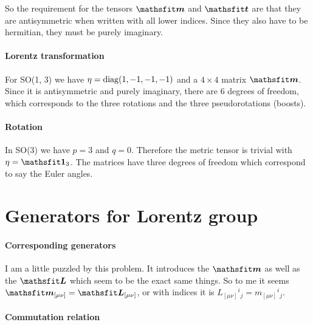 \documentclass[11pt, english, fleqn, DIV=15, headinclude, BCOR=1cm]{scrartcl}
\begin{document}
So the requirement for the tensors $\tens m$ and $\tens t$ are that they are
antisymmetric when written with all lower indices. Since they also have to be
hermitian, they must be purely imaginary.

\paragraph{Lorentz transformation}

For SO(1, 3) we have $\eta = \operatorname{diag}(1, -1, -1, -1)$ and a $4\times 4$ matrix
$\tens m$. Since it is antisymmetric and purely imaginary, there are 6 degrees
of freedom, which corresponds to the three rotations and the three
pseudorotations (boosts).

\paragraph{Rotation}

In SO(3) we have $p = 3$ and $q = 0$. Therefore the metric tensor is trivial
with $\eta = \tens 1_3$. The matrices have three degrees of freedom which
correspond to say the Euler angles.

\section{Generators for Lorentz group}

\paragraph{Corresponding generators}

I am a little puzzled by this problem. It introduces the $\tens m$ as well as
the $\tens L$ which seem to be the exact same things. So to me it seems $\tens
m_{[\mu\nu]} = \tens L_{[\mu\nu]}$, or with indices it is $L_{[\mu\nu]}{}^i{}_j
= m_{[\mu\nu]}{}^i{}_j$.

\paragraph{Commutation relation}
\end{document}
